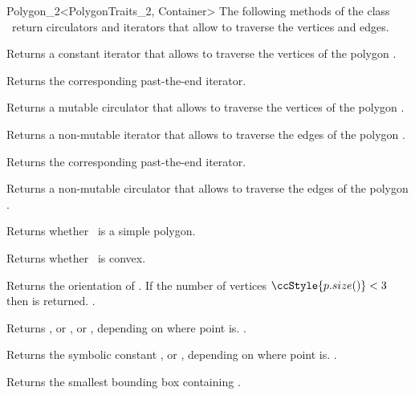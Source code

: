 \begin{ccRefClass}{Polygon_2<PolygonTraits_2, Container>}
\ccAccessFunctions
The following methods of the class \ccClassName\ return
circulators and iterators that allow to traverse the vertices and edges.

    { Returns a constant iterator that allows to traverse the vertices of
      the polygon  \ccVar.}

    { Returns the corresponding past-the-end iterator. }

    { Returns a mutable circulator that allows to traverse the vertices of
      the polygon \ccVar.}

    { Returns a non-mutable iterator that allows to traverse the edges of
      the polygon \ccVar.}

    { Returns the corresponding past-the-end iterator. }

    { Returns a non-mutable circulator that allows to traverse the edges of
      the polygon \ccVar.}

\ccPredicates

    { Returns whether \ccVar\ is a simple polygon.}

    { Returns whether \ccVar\ is convex. }

    { Returns the orientation of \ccVar. If the number of vertices 
      $\ccStyle{p.size()} < 3$ then  is returned.
      \ccPrecond {}.
    }

    { Returns , or ,
       or , 
       depending on where point  is.
      \ccPrecond {}.
    }

    { Returns the symbolic constant , 
      or , depending on where point
       is.
      \ccPrecond {}.
    }

    { Returns the smallest bounding box containing \ccVar.}
    

\end{ccRefClass}
